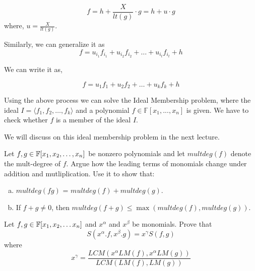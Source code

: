 $$ f = h + \frac{X}{lt(g)}\cdot g  = h + u\cdot g$$ where, $u = \frac{X}{lt(g)}$.

Similarly, we can generalize it as
$$ f = u_{i_1}f_{i_1} + u_{i_2}f_{i_2} + \ldots + u_{i_t}f_{i_t} + h $$

We can write it as,

$$ f = u_1f_1 + u_2f_2 + \ldots + u_kf_k + h $$

\begin{observation}
Using the above process we can solve the Ideal Membership problem, where the ideal $ I = \langle f_1,f_2, \ldots ,f_k \rangle$ and a polynomial $f \in \mathbb{F}[x_1,...,x_n]$ is given. We have to check whether $f$ is a member of the ideal $I$.

\end{observation}


We will discuss on this ideal membership problem in the next lecture.

 \begin{exercise}
Let $f,g \in {\mathbb{F}}[x_1, x_2, \ldots, x_n]$ be nonzero polynomials and let $multdeg(f)$ denote the mult-degree of $f$. Argue how the leading terms of monomials change under addition and mutliplication. Use it to show that:
\begin{enumerate}[(a)]
\item $multdeg(fg)$ = $multdeg(f)+multdeg(g)$.
\item If $f+g \ne 0$, then $multdeg(f+g) \le \max(multdeg(f),multdeg(g))$.
\end{enumerate}
\end{exercise}


\begin{exercise}
Let $f, g \in {\mathbb{F}}[x_1, x_2, \ldots x_n]$ and $x^\alpha$ and $x^\beta$ be monomials. Prove that 
\[ S(x^\alpha.f,x^\beta.g) = x^\gamma S(f,g) \]
where
\[ x^\gamma = \frac{LCM(x^\alpha LM(f),x^\alpha LM(g))}{LCM(LM(f),LM(g))} \]
\end{exercise}


















